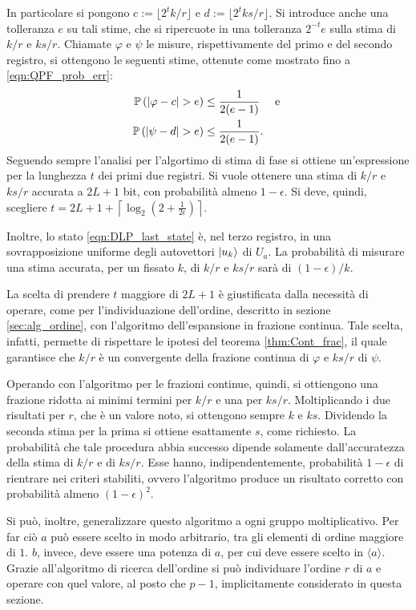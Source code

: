 In particolare si pongono $c := \lfloor 2^tk/r \rfloor$ e $d := \lfloor 2^tks/r \rfloor$.
Si introduce anche una tolleranza $e$ su tali stime, che si ripercuote in una tolleranza $2^{-t}e$ sulla stima di $k/r$ e $ks/r$.
Chiamate $\varphi$ e $\psi$ le misure, rispettivamente del primo e del secondo registro, si ottengono le seguenti stime, ottenute come mostrato fino a \eqref{eqn:QPF_prob_err}:
\begin{align}
 \P\left(|\varphi - c| > e \right) &\leq \frac{1}{2(e-1)} \quad \text{ e }\\
 \P\left(|\psi - d| > e \right) &\leq \frac{1}{2(e-1)}.
\end{align}
Seguendo sempre l'analisi per l'algortimo di stima di fase si ottiene un'espressione per la lunghezza $t$ dei primi due registri.
Si vuole ottenere una stima di $k/r$ e $ks/r$ accurata a $2L + 1$ bit, con probabilità almeno $1 - \epsilon$.
Si deve, quindi, scegliere $t = 2L + 1 + \left\lceil \log_2\left(2 + \frac{1}{2\epsilon}\right)\right\rceil$.

Inoltre, lo stato \eqref{eqn:DLP_last_state} è, nel terzo registro, in una sovrapposizione uniforme degli autovettori $\ket{u_k}$ di $U_a$.
La probabilità di misurare una stima accurata, per un fissato $k$, di $k/r$ e $ks/r$ sarà di $(1-\epsilon)/k$.

La scelta di prendere $t$ maggiore di $2L+1$ è giustificata dalla necessità di operare, come per l'individuazione dell'ordine, descritto in sezione \ref{sec:alg_ordine}, con l'algoritmo dell'espansione in frazione continua.
Tale scelta, infatti, permette di rispettare le ipotesi del teorema \ref{thm:Cont_frac}, il quale garantisce che $k/r$ è un convergente della frazione continua di $\varphi$ e $ks/r$ di $\psi$.

Operando con l'algoritmo per le frazioni continue, quindi, si ottiengono una frazione ridotta ai minimi termini per $k/r$ e una per $ks/r$.
Moltiplicando i due risultati per $r$, che è un valore noto, si ottengono sempre $k$ e $ks$.
Dividendo la seconda stima per la prima si ottiene esattamente $s$, come richiesto.
La probabilità che tale procedura abbia successo dipende solamente dall'accuratezza della stima di $k/r$ e di $ks/r$.
Esse hanno, indipendentemente, probabilità $1-\epsilon$ di rientrare nei criteri stabiliti, ovvero l'algoritmo produce un risultato corretto con probabilità almeno $\left(1 - \epsilon \right)^2$.

Si può, inoltre, generalizzare questo algoritmo a ogni gruppo moltiplicativo.
Per far ciò $a$ può essere scelto in modo arbitrario, tra gli elementi di ordine maggiore di $1$.
$b$, invece, deve essere una potenza di $a$, per cui deve essere scelto in $\langle a \rangle$.
Grazie all'algoritmo di ricerca dell'ordine si può individuare l'ordine $r$ di $a$ e operare con quel valore, al posto che $p-1$, implicitamente considerato in questa sezione.


